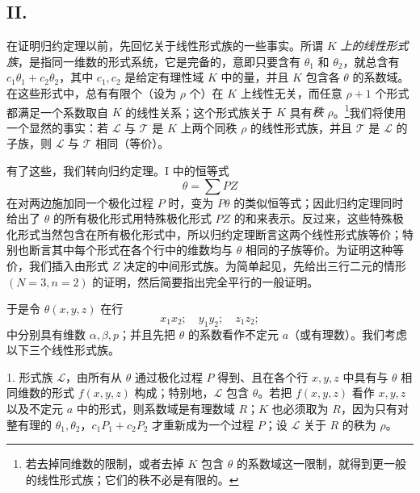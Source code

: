 \subsection*{II.}
在证明归约定理以前，先回忆关于线性形式族的一些事实。所谓 \emph{$K$ 上的线性形式族}，是指同一维数的形式系统，它是完备的，意即只要含有 $\theta_1$ 和 $\theta_2$，就总含有 $c_1\theta_1+c_2\theta_2$，其中 $c_1,c_2$ 是给定有理性域 $K$ 中的量，并且 $K$ 包含各 $\theta$ 的系数域。在这些形式中，总有有限个（设为 $\rho$ 个）在 $K$ 上线性无关，而任意 $\rho+1$ 个形式都满足一个系数取自 $K$ 的线性关系；这个形式族关于 $K$ 具有\emph{秩 $\rho$}。\footnote{若去掉同维数的限制，或者去掉 $K$ 包含 $\theta$ 的系数域这一限制，就得到更一般的线性形式族；它们的秩不必是有限的。}我们将使用一个显然的事实：若 $\mathcal L$ 与 $\mathcal T$ 是 $K$ 上两个同秩 $\rho$ 的线性形式族，并且 $\mathcal T$ 是 $\mathcal L$ 的子族，则 $\mathcal L$ 与 $\mathcal T$ 相同（等价）。

有了这些，我们转向归约定理。I 中的恒等式
\[
  \theta=\sum PZ
\]
在对两边施加同一个极化过程 $P$ 时，变为 $P\theta$ 的类似恒等式；因此归约定理同时给出了 $\theta$ 的所有极化形式用特殊极化形式 $PZ$ 的和来表示。反过来，这些特殊极化形式当然包含在所有极化形式中，所以归约定理断言这两个线性形式族等价；特别也断言其中每个形式在各个行中的维数均与 $\theta$ 相同的子族等价。为证明这种等价，我们插入由形式 $Z$ 决定的中间形式族。为简单起见，先给出三行二元的情形 $(N=3,n=2)$ 的证明，然后简要指出完全平行的一般证明。

于是令 $\theta(x,y,z)$ 在行
\[
  x_1x_2;\quad y_1y_2;\quad z_1z_2;
\]
中分别具有维数 $\alpha,\beta,p$；并且先把 $\theta$ 的系数看作不定元 $a$（或有理数）。我们考虑以下三个线性形式族。

1. 形式族 $\mathcal L$，由所有从 $\theta$ 通过极化过程 $P$ 得到、且在各个行 $x,y,z$ 中具有与 $\theta$ 相同维数的形式 $f(x,y,z)$ 构成；特别地，$\mathcal L$ 包含 $\theta$。若把 $f(x,y,z)$ 看作 $x,y,z$ 以及不定元 $a$ 中的形式，则系数域是有理数域 $R$；$K$ 也必须取为 $R$，因为只有对整有理的 $\theta_1,\theta_2$，$c_1P_1+c_2P_2$ 才重新成为一个过程 $P$；设 $\mathcal L$ 关于 $R$ 的秩为 $\rho$。

